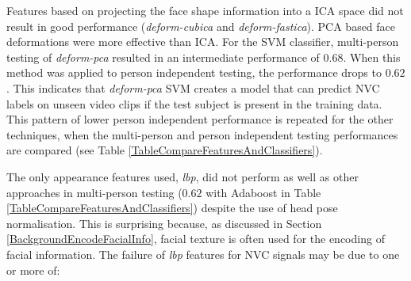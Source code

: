 

Features based on projecting the face shape information into a \ac{ICA} space did not result in good performance (\textit{deform-cubica} and \textit{deform-fastica}). 
PCA based face deformations were more effective than \ac{ICA}. For the \ac{SVM} classifier, multi-person testing of \textit{deform-pca} resulted in an intermediate performance of $0.68$. When this method was applied to person independent testing, the performance drops to $0.62$. This indicates that \textit{deform-pca} \ac{SVM} creates a model that can predict \ac{NVC} labels on unseen video clips if the test subject is present in the training data. %
This pattern of lower person independent performance is repeated for the other \featureGeneration techniques, when the multi-person and person independent testing performances are compared (see Table \ref{TableCompareFeaturesAndClassifiers}).


The only appearance features used, \textit{lbp}, did not perform as well as other approaches in multi-person testing ($0.62$ with Adaboost in Table \ref{TableCompareFeaturesAndClassifiers}) despite the use of head pose normalisation. 
This is surprising because, as discussed in Section \ref{BackgroundEncodeFacialInfo}, facial texture is often used for the encoding of facial information. The failure of \textit{lbp} features for \ac{NVC} signals may be due to one or more of:

